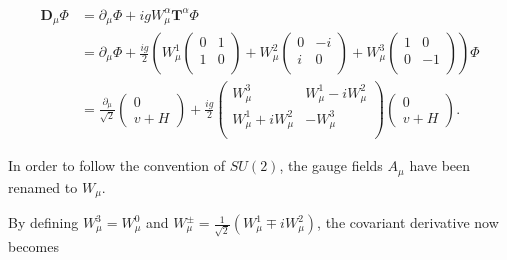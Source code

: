 \documentclass{article}
\begin{document}
\begin{equation}
\begin{split}
\bm{D}_\mu \Phi & = \partial_\mu \Phi + igW^{\alpha}_\mu \bm{T}^\alpha \Phi \\
& = \partial_\mu \Phi + \frac{ig}{2}\left( W^{1}_\mu \left(
\begin{matrix}
0 & 1 \\
1 & 0 \\
\end{matrix}\right) + W^{2}_\mu \left(
\begin{matrix}
0 & -i \\
i & 0 \\
\end{matrix}\right) + W^{3}_\mu \left(
\begin{matrix}
1 & 0 \\
0 & -1 \\
\end{matrix}\right)\right)\Phi\\
& = \frac{\partial_\mu}{\sqrt{2}}\left(\begin{matrix}
0 \\
v + H
\end{matrix}\right) + \frac{ig}{2}\left(\begin{matrix}
W^{3}_\mu & W^{1}_\mu -iW^{2}_\mu \\
W^{1}_\mu + iW^{2}_\mu & -W^{3}_\mu\\
\end{matrix}\right)\left(\begin{matrix}
0 \\
v + H
\end{matrix}\right).
\end{split}
\end{equation}

In order to follow the convention of $SU(2)$, the gauge fields $A_\mu$ have been renamed to $W_\mu$.

By defining $W^{3}_\mu = W^{0}_\mu$ and $W^{\pm}_\mu = \frac{1}{\sqrt{2}}(W^{1}_\mu \mp iW^{2}_\mu)$, the covariant derivative now becomes
\end{document}
